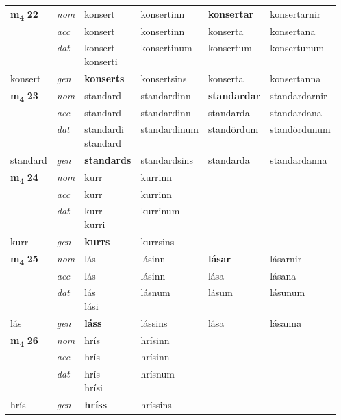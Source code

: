 \begin{longtable}[l]{X>{\footnotesize\itshape}XXXXX}
\multirow{3}{*}{{{\textbf{m{\textsubscript{4}}} \Large{\textbf{22}}}}} & nom & konsert & konsertinn & \textbf{konsertar} & konsertarnir \\*
 & acc & konsert & konsertinn & konserta & konsertana \\*
 & dat & \specialcell{konsert\\ konserti} & konsertinum & konsertum & konsertunum \\*
 {\footnotesize{konsert}} & gen & \textbf{konserts} & konsertsins & konserta & konsertanna \\
\cmidrule{1-6}

\multirow{3}{*}{{{\textbf{m{\textsubscript{4}}} \Large{\textbf{23}}}}} & nom & standard & standardinn & \textbf{standardar} & standardarnir \\*
 & acc & standard & standardinn & standarda & standardana \\*
 & dat & \specialcell{standardi\\ standard} & standardinum & standördum & standördunum \\*
 {\footnotesize{standard}} & gen & \textbf{standards} & standardsins & standarda & standardanna \\
\cmidrule{1-6}

\multirow{3}{*}{{{\textbf{m{\textsubscript{4}}} \Large{\textbf{24}}}}} & nom & kurr & kurrinn & \textbf{} &  \\*
 & acc & kurr & kurrinn &  &  \\*
 & dat & \specialcell{kurr\\ kurri} & kurrinum &  &  \\*
 {\footnotesize{kurr}} & gen & \textbf{kurrs} & kurrsins &  &  \\
\cmidrule{1-6}

\multirow{3}{*}{{{\textbf{m{\textsubscript{4}}} \Large{\textbf{25}}}}} & nom & lás & lásinn & \textbf{lásar} & lásarnir \\*
 & acc & lás & lásinn & lása & lásana \\*
 & dat & \specialcell{lás\\ lási} & lásnum & lásum & lásunum \\*
 {\footnotesize{lás}} & gen & \textbf{láss} & lássins & lása & lásanna \\
\cmidrule{1-6}

\multirow{3}{*}{{{\textbf{m{\textsubscript{4}}} \Large{\textbf{26}}}}} & nom & hrís & hrísinn & \textbf{} &  \\*
 & acc & hrís & hrísinn &  &  \\*
 & dat & \specialcell{hrís\\ hrísi} & hrísnum &  &  \\*
 {\footnotesize{hrís}} & gen & \textbf{hríss} & hríssins &  &  \\
\cmidrule{1-6}


\end{longtable}
